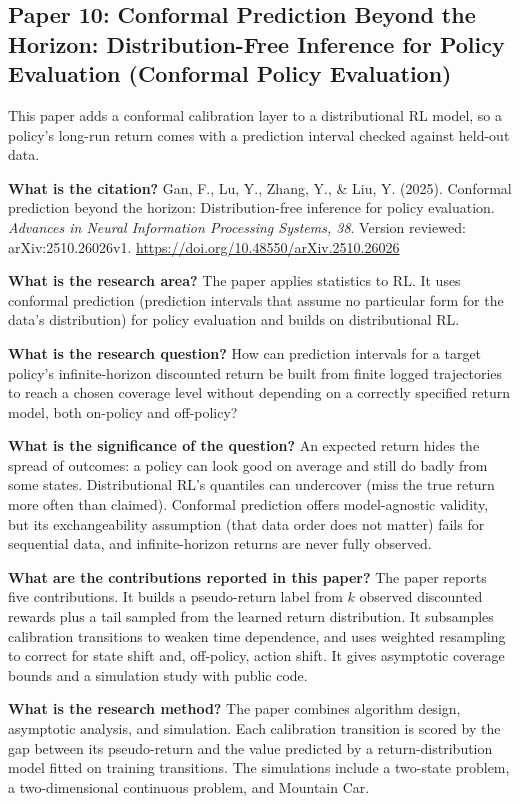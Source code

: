 \documentclass[11pt]{article}
\newcommand{\paper}[1]{\subsection*{#1}}
\newcommand{\q}[2]{\item \textbf{#1} #2}
\begin{document}
\paper{Paper 10: Conformal Prediction Beyond the Horizon: Distribution-Free Inference for Policy Evaluation (Conformal Policy Evaluation)}
This paper adds a conformal calibration layer to a distributional RL model, so a policy's long-run return comes with a prediction interval checked against held-out data.
\begin{qna}

\q{What is the citation?}
Gan, F., Lu, Y., Zhang, Y., \& Liu, Y. (2025). Conformal prediction beyond the horizon: Distribution-free inference for policy evaluation. \emph{Advances in Neural Information Processing Systems, 38}. Version reviewed: arXiv:2510.26026v1. \url{https://doi.org/10.48550/arXiv.2510.26026}

\q{What is the research area?}
The paper applies statistics to RL. It uses conformal prediction (prediction intervals that assume no particular form for the data's distribution) for policy evaluation and builds on distributional RL.

\q{What is the research question?}
How can prediction intervals for a target policy's infinite-horizon discounted return be built from finite logged trajectories to reach a chosen coverage level without depending on a correctly specified return model, both on-policy and off-policy?

\q{What is the significance of the question?}
An expected return hides the spread of outcomes: a policy can look good on average and still do badly from some states. Distributional RL's quantiles can undercover (miss the true return more often than claimed). Conformal prediction offers model-agnostic validity, but its exchangeability assumption (that data order does not matter) fails for sequential data, and infinite-horizon returns are never fully observed.

\q{What are the contributions reported in this paper?}
The paper reports five contributions. It builds a pseudo-return label from $k$ observed discounted rewards plus a tail sampled from the learned return distribution. It subsamples calibration transitions to weaken time dependence, and uses weighted resampling to correct for state shift and, off-policy, action shift. It gives asymptotic coverage bounds and a simulation study with public code.

\q{What is the research method?}
The paper combines algorithm design, asymptotic analysis, and simulation. Each calibration transition is scored by the gap between its pseudo-return and the value predicted by a return-distribution model fitted on training transitions. The simulations include a two-state problem, a two-dimensional continuous problem, and Mountain Car.


\end{qna}
\end{document}
